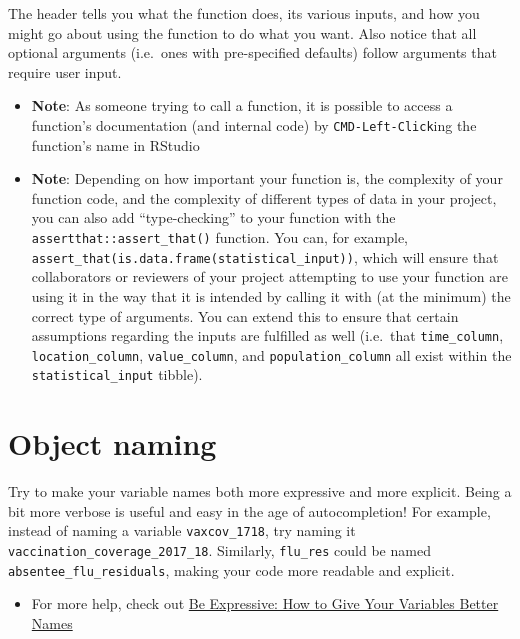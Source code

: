 \documentclass[]{book}
\providecommand{\tightlist}{%
  \setlength{\itemsep}{0pt}\setlength{\parskip}{0pt}}
\begin{document}
The header tells you what the function does, its various inputs, and how you might go about using the function to do what you want. Also notice that all optional arguments (i.e.~ones with pre-specified defaults) follow arguments that require user input.

\begin{itemize}
\item
  \textbf{Note}: As someone trying to call a function, it is possible to access a function's documentation (and internal code) by \texttt{CMD-Left-Click}ing the function's name in RStudio
\item
  \textbf{Note}: Depending on how important your function is, the complexity of your function code, and the complexity of different types of data in your project, you can also add ``type-checking'' to your function with the \texttt{assertthat::assert\_that()} function. You can, for example, \texttt{assert\_that(is.data.frame(statistical\_input))}, which will ensure that collaborators or reviewers of your project attempting to use your function are using it in the way that it is intended by calling it with (at the minimum) the correct type of arguments. You can extend this to ensure that certain assumptions regarding the inputs are fulfilled as well (i.e.~that \texttt{time\_column}, \texttt{location\_column}, \texttt{value\_column}, and \texttt{population\_column} all exist within the \texttt{statistical\_input} tibble).
\end{itemize}

\hypertarget{object-naming}{%
\section{Object naming}\label{object-naming}}

Try to make your variable names both more expressive and more explicit. Being a bit more verbose is useful and easy in the age of autocompletion! For example, instead of naming a variable \texttt{vaxcov\_1718}, try naming it \texttt{vaccination\_coverage\_2017\_18}. Similarly, \texttt{flu\_res} could be named \texttt{absentee\_flu\_residuals}, making your code more readable and explicit.

\begin{itemize}
\tightlist
\item
  For more help, check out \href{https://spin.atomicobject.com/2017/11/01/good-variable-names/}{Be Expressive: How to Give Your Variables Better Names}
\end{itemize}
\end{document}
